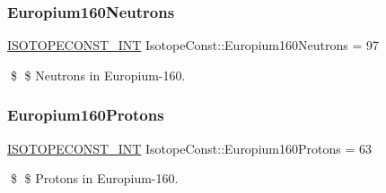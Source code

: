 \subsubsection{\texorpdfstring{Europium160\+Neutrons}{Europium160Neutrons}}
{\footnotesize\ttfamily \mbox{\hyperlink{group___isotope_const-_macros_ga5f18360b3e99483a35c32d789e62621c}{I\+S\+O\+T\+O\+P\+E\+C\+O\+N\+S\+T\+\_\+\+I\+NT}} Isotope\+Const\+::\+Europium160\+Neutrons = 97}

\$ \$ Neutrons in Europium-\/160. \mbox{\label{group___isotope_const-_europium-_eu160_ga654aea63b4bae0dfd066ffa0ee0a7ff9}} 
\subsubsection{\texorpdfstring{Europium160\+Protons}{Europium160Protons}}
{\footnotesize\ttfamily \mbox{\hyperlink{group___isotope_const-_macros_ga5f18360b3e99483a35c32d789e62621c}{I\+S\+O\+T\+O\+P\+E\+C\+O\+N\+S\+T\+\_\+\+I\+NT}} Isotope\+Const\+::\+Europium160\+Protons = 63}

\$ \$ Protons in Europium-\/160. 